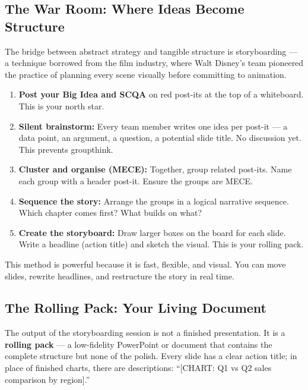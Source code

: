 \subsection{The War Room: Where Ideas Become Structure}
The bridge between abstract strategy and tangible structure is storyboarding --- a technique borrowed from the film industry, where Walt Disney's team pioneered the practice of planning every scene visually before committing to animation.

\begin{keybox}
\begin{enumerate}
  \item \textbf{Post your Big Idea and SCQA} on red post-its at the top of a whiteboard. This is your north star.
  \item \textbf{Silent brainstorm:} Every team member writes one idea per post-it --- a data point, an argument, a question, a potential slide title. No discussion yet. This prevents groupthink.
  \item \textbf{Cluster and organise (MECE):} Together, group related post-its. Name each group with a header post-it. Ensure the groups are MECE.
  \item \textbf{Sequence the story:} Arrange the groups in a logical narrative sequence. Which chapter comes first? What builds on what?
  \item \textbf{Create the storyboard:} Draw larger boxes on the board for each slide. Write a headline (action title) and sketch the visual. This is your rolling pack.
\end{enumerate}
This method is powerful because it is fast, flexible, and visual. You can move slides, rewrite headlines, and restructure the story in real time.
\end{keybox}

\subsection{The Rolling Pack: Your Living Document}
The output of the storyboarding session is not a finished presentation. It is a \textbf{rolling pack} --- a low-fidelity PowerPoint or document that contains the complete structure but none of the polish. Every slide has a clear action title; in place of finished charts, there are descriptions: ``[CHART: Q1 vs Q2 sales comparison by region].''

